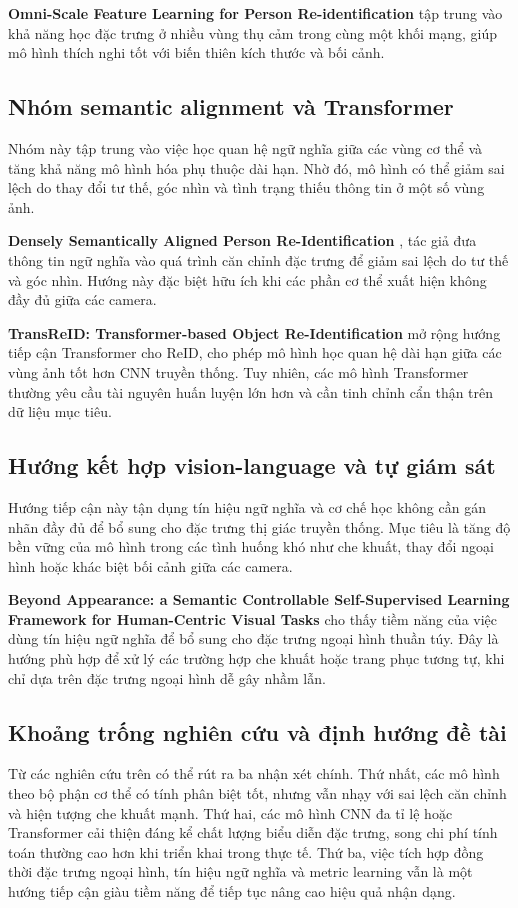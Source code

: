 \textbf{Omni-Scale Feature Learning for Person Re-identification}
\cite{zhou2019omniscalefeaturelearningperson} tập trung vào khả năng học đặc
trưng ở nhiều vùng thụ cảm trong cùng một khối mạng, giúp mô hình thích nghi
tốt với biến thiên kích thước và bối cảnh.

\subsection{Nhóm semantic alignment và Transformer}
Nhóm này tập trung vào việc học quan hệ ngữ nghĩa giữa các vùng cơ thể và tăng
khả năng mô hình hóa phụ thuộc dài hạn. Nhờ đó, mô hình có thể giảm sai lệch do
thay đổi tư thế, góc nhìn và tình trạng thiếu thông tin ở một số vùng ảnh.

\textbf{Densely Semantically Aligned Person Re-Identification}
\cite{zhang2019denselysemanticallyalignedperson}, tác giả đưa thông tin ngữ
nghĩa vào quá trình căn chỉnh đặc trưng để giảm sai lệch do tư thế và góc nhìn.
Hướng này đặc biệt hữu ích khi các phần cơ thể xuất hiện không đầy đủ giữa các
camera.

\textbf{TransReID: Transformer-based Object Re-Identification}
\cite{he2021transreidtransformerbasedobjectreidentification} mở rộng hướng tiếp
cận Transformer cho ReID, cho phép mô hình học quan hệ dài hạn giữa các vùng
ảnh tốt hơn CNN truyền thống. Tuy nhiên, các mô hình Transformer thường yêu cầu
tài nguyên huấn luyện lớn hơn và cần tinh chỉnh cẩn thận trên dữ liệu mục tiêu.

\subsection{Hướng kết hợp vision-language và tự giám sát}
Hướng tiếp cận này tận dụng tín hiệu ngữ nghĩa và cơ chế học không cần gán nhãn
đầy đủ để bổ sung cho đặc trưng thị giác truyền thống. Mục tiêu là tăng độ bền
vững của mô hình trong các tình huống khó như che khuất, thay đổi ngoại hình
hoặc khác biệt bối cảnh giữa các camera.

\textbf{Beyond Appearance: a Semantic Controllable Self-Supervised Learning
Framework for Human-Centric Visual Tasks}
\cite{chen2023appearancesemanticcontrollableselfsupervised} cho thấy tiềm năng
của việc dùng tín hiệu ngữ nghĩa để bổ sung cho đặc trưng ngoại hình thuần túy.
Đây là hướng phù hợp để xử lý các trường hợp che khuất hoặc trang phục tương tự,
khi chỉ dựa trên đặc trưng ngoại hình dễ gây nhầm lẫn.

\subsection{Khoảng trống nghiên cứu và định hướng đề tài}
Từ các nghiên cứu trên có thể rút ra ba nhận xét chính. Thứ nhất, các mô hình
theo bộ phận cơ thể có tính phân biệt tốt, nhưng vẫn nhạy với sai lệch căn
chỉnh và hiện tượng che khuất mạnh. Thứ hai, các mô hình CNN đa tỉ lệ hoặc
Transformer cải thiện đáng kể chất lượng biểu diễn đặc trưng, song chi phí tính
toán thường cao hơn khi triển khai trong thực tế. Thứ ba, việc tích hợp đồng
thời đặc trưng ngoại hình, tín hiệu ngữ nghĩa và metric learning vẫn là một
hướng tiếp cận giàu tiềm năng để tiếp tục nâng cao hiệu quả nhận dạng.


